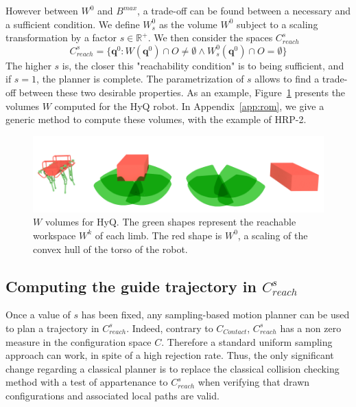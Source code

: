 However between $W^0$ and $B^{max}$, a trade-off can be found between a necessary and a sufficient condition. We define $W^0_s$ as the volume $W^0$ subject to a scaling transformation by a factor $s \in \mathbb{R}^+$. 
%
We then consider the spaces $C_{reach}^s$
 \begin{equation}
C_{reach}^s = \{ \mathbf{q}^0 : W(\mathbf{q}^{0}) \cap O \neq \emptyset \wedge W^0_s(\mathbf{q}^{0}) \cap O = \emptyset \} %
\end{equation}
%
The higher $s$ is, the closer this "reachability condition" is to being sufficient, and if $s=1$, the planner is complete. The parametrization of $s$ allows to find a trade-off between these two desirable properties.
As an example, Figure~\ref{fig:hyq_roms} presents the volumes $W$ computed for the HyQ robot.
In Appendix~\ref{app:rom}, we give a generic method to compute these volumes, with the example of HRP-2.

\begin{figure}
  \centering
  \includegraphics[width=0.95\linewidth]{figures/hyq_roms}
  \caption{
           $W$ volumes for HyQ. The green shapes represent the reachable workspace $W^k$ of each limb. The red shape is $W^0$, a scaling of the convex hull
           of the torso of the robot.}
		   \label{fig:hyq_roms}
\end{figure}

\subsection{Computing the guide trajectory in $C_{reach}^s$}
Once a value of $s$ has been fixed, any sampling-based motion planner can be used to plan a trajectory in $C_{reach}^s$. 
Indeed, contrary to $C_{Contact}$,  $C_{reach}^s$ has a non zero measure in the configuration space $C$. Therefore a standard uniform sampling approach
can work, in spite of a high rejection rate. 
Thus, the only significant change regarding a classical planner is to replace the classical collision checking method with a test of appartenance to $C_{reach}^s$ when verifying
that drawn configurations and associated local paths are valid.

